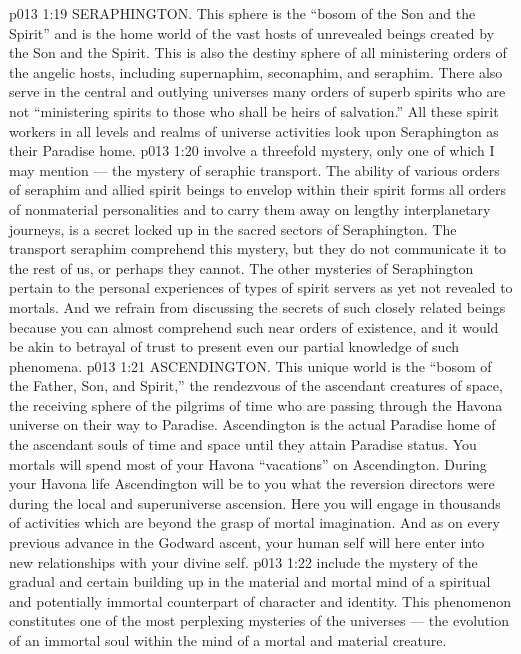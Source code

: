 \vs p013 1:19 \bibnobreakspace SERAPHINGTON. This sphere is the “bosom of the Son and the Spirit” and is the home world of the vast hosts of unrevealed beings created by the Son and the Spirit. This is also the destiny sphere of all ministering orders of the angelic hosts, including supernaphim, seconaphim, and seraphim. There also serve in the central and outlying universes many orders of superb spirits who are not “ministering spirits to those who shall be heirs of salvation.” All these spirit workers in all levels and realms of universe activities look upon Seraphington as their Paradise home.
\vs p013 1:20 \pc {} involve a threefold mystery, only one of which I may mention --- the mystery of seraphic transport. The ability of various orders of seraphim and allied spirit beings to envelop within their spirit forms all orders of nonmaterial personalities and to carry them away on lengthy interplanetary journeys, is a secret locked up in the sacred sectors of Seraphington. The transport seraphim comprehend this mystery, but they do not communicate it to the rest of us, or perhaps they cannot. The other mysteries of Seraphington pertain to the personal experiences of types of spirit servers as yet not revealed to mortals. And we refrain from discussing the secrets of such closely related beings because you can almost comprehend such near orders of existence, and it would be akin to betrayal of trust to present even our partial knowledge of such phenomena.
\vs p013 1:21 \bibnobreakspace ASCENDINGTON. This unique world is the “bosom of the Father, Son, and Spirit,” the rendezvous of the ascendant creatures of space, the receiving sphere of the pilgrims of time who are passing through the Havona universe on their way to Paradise. Ascendington is the actual Paradise home of the ascendant souls of time and space until they attain Paradise status. You mortals will spend most of your Havona “vacations” on Ascendington. During your Havona life Ascendington will be to you what the reversion directors were during the local and superuniverse ascension. Here you will engage in thousands of activities which are beyond the grasp of mortal imagination. And as on every previous advance in the Godward ascent, your human self will here enter into new relationships with your divine self.
\vs p013 1:22 \pc {} include the mystery of the gradual and certain building up in the material and mortal mind of a spiritual and potentially immortal counterpart of character and identity. This phenomenon constitutes one of the most perplexing mysteries of the universes --- the evolution of an immortal soul within the mind of a mortal and material creature.
